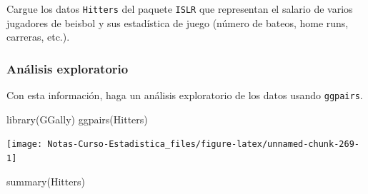 \documentclass[
  12pt,
]{book}
\newenvironment{Shaded}{\begin{snugshade}}{\end{snugshade}}
\newcommand{\FunctionTok}[1]{\textcolor[rgb]{0.00,0.00,0.00}{#1}}
\newcommand{\NormalTok}[1]{#1}
\theoremstyle{definition}
\theoremstyle{definition}
\theoremstyle{definition}
\theoremstyle{remark}
\begin{document}
Cargue los datos \texttt{Hitters} del paquete \texttt{ISLR} que representan el salario de varios jugadores de beisbol y sus estadística de juego (número de bateos, home runs, carreras, etc.).

\hypertarget{anuxe1lisis-exploratorio}{%
\subsubsection{Análisis exploratorio}\label{anuxe1lisis-exploratorio}}

Con esta información, haga un análisis exploratorio de los datos usando \texttt{ggpairs}.

\begin{Shaded}
\begin{Highlighting}[]
\FunctionTok{library}\NormalTok{(GGally)}
\FunctionTok{ggpairs}\NormalTok{(Hitters)}
\end{Highlighting}
\end{Shaded}

\begin{center}\texttt{[image: Notas-Curso-Estadistica\_files/figure-latex/unnamed-chunk-269-1]} \end{center}

\begin{Shaded}
\begin{Highlighting}[]
\FunctionTok{summary}\NormalTok{(Hitters)}
\end{Highlighting}
\end{Shaded}
\end{document}
